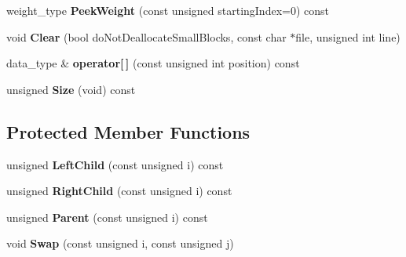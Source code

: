 \begin{DoxyCompactItemize}
\item 
\hypertarget{class_data_structures_1_1_heap_a50ae6f55a75156e2ab679a0575ebe7ef}{weight\-\_\-type {\bfseries Peek\-Weight} (const unsigned starting\-Index=0) const }\label{class_data_structures_1_1_heap_a50ae6f55a75156e2ab679a0575ebe7ef}

\item 
\hypertarget{class_data_structures_1_1_heap_ab573390b91ff42db9465a289f1c417de}{void {\bfseries Clear} (bool do\-Not\-Deallocate\-Small\-Blocks, const char $\ast$file, unsigned int line)}\label{class_data_structures_1_1_heap_ab573390b91ff42db9465a289f1c417de}

\item 
\hypertarget{class_data_structures_1_1_heap_a6acedaf4d89f1de86e0ea256a4773b31}{data\-\_\-type \& {\bfseries operator\mbox{[}$\,$\mbox{]}} (const unsigned int position) const }\label{class_data_structures_1_1_heap_a6acedaf4d89f1de86e0ea256a4773b31}

\item 
\hypertarget{class_data_structures_1_1_heap_acdb7d16c52998d6fc8a7b1a8602b8906}{unsigned {\bfseries Size} (void) const }\label{class_data_structures_1_1_heap_acdb7d16c52998d6fc8a7b1a8602b8906}

\end{DoxyCompactItemize}
\subsection*{Protected Member Functions}
\begin{DoxyCompactItemize}
\item 
\hypertarget{class_data_structures_1_1_heap_a9317b3913a553113cd3a04ef471e595e}{unsigned {\bfseries Left\-Child} (const unsigned i) const }\label{class_data_structures_1_1_heap_a9317b3913a553113cd3a04ef471e595e}

\item 
\hypertarget{class_data_structures_1_1_heap_aa5363b61f35910c7754ded825000df27}{unsigned {\bfseries Right\-Child} (const unsigned i) const }\label{class_data_structures_1_1_heap_aa5363b61f35910c7754ded825000df27}

\item 
\hypertarget{class_data_structures_1_1_heap_a4b7d3b580d84c3884139f8599142ca51}{unsigned {\bfseries Parent} (const unsigned i) const }\label{class_data_structures_1_1_heap_a4b7d3b580d84c3884139f8599142ca51}

\item 
\hypertarget{class_data_structures_1_1_heap_a6037614b00405c5a57d06d0b98264f3f}{void {\bfseries Swap} (const unsigned i, const unsigned j)}\label{class_data_structures_1_1_heap_a6037614b00405c5a57d06d0b98264f3f}

\end{DoxyCompactItemize}
